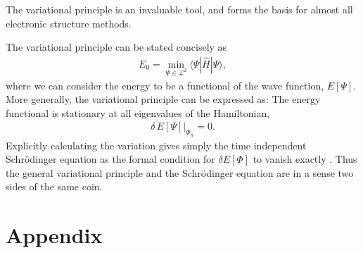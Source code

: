 \documentclass[../../master.tex]{subfiles}
\begin{document}
The variational principle is an invaluable tool, and forms the basis for almost all electronic structure methods. 

The variational principle can be stated concisely as 
\begin{align}
E_0 = \min_{\Psi\in \mathcal{L}^2}\big\langle \Psi | \hat H | \Psi \big\rangle,
\end{align}
where we can consider the energy to be a functional of the wave function, $E[\Psi]$. More generally, the variational principle can be expressed as: The energy functional is stationary at all eigenvalues of the Hamiltonian, \cite{yangparr}\cite{kryachko}
\begin{align}
\delta \, E[\Psi]\Big|_{\Phi_n}=0.
\end{align}
Explicitly calculating the variation gives simply the time independent Schrödinger equation as the formal condition for $\delta E[\Phi]$ to vanish exactly \cite{martin}. Thus the general variational principle and the Schrödinger equation are in a sense two sides of the same coin.






























\section{Appendix}
\end{document}
